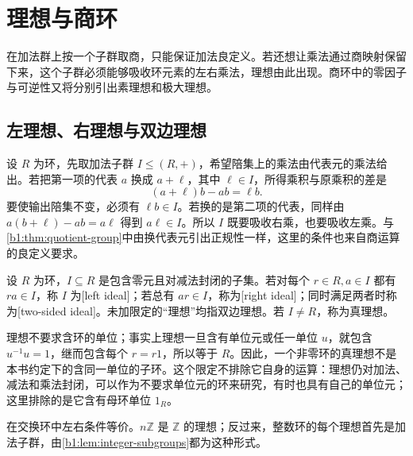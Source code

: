 
\section{理想与商环}
\label{b1:sec:1002}

在加法群上按一个子群取商，只能保证加法良定义。若还想让乘法通过商映射保留下来，这个子群必须能够吸收环元素的左右乘法，理想由此出现。商环中的零因子与可逆性又将分别引出素理想和极大理想。

%
%

\subsection{左理想、右理想与双边理想}
\label{b1:subsec:1002:01}
设 \(R\) 为环，先取加法子群 \(I\leq(R,+)\)，希望陪集上的乘法由代表元的乘法给出。若把第一项的代表 \(a\) 换成 \(a+\ell\)，其中 \(\ell\in I\)，所得乘积与原乘积的差是
\[
	(a+\ell)b-ab=\ell b.
\]
要使输出陪集不变，必须有 \(\ell b\in I\)。若换的是第二项的代表，同样由 \(a(b+\ell)-ab=a\ell\) 得到 \(a\ell\in I\)。所以 \(I\) 既要吸收右乘，也要吸收左乘。与\cref{b1:thm:quotient-group}中由换代表元引出正规性一样，这里的条件也来自商运算的良定义要求。

\begin{definition}\label{b1:def:ring-ideal}
	设 \(R\) 为环，\(I\subseteq R\) 是包含零元且对减法封闭的子集。若对每个 \(r\in R,a\in I\) 都有 \(ra\in I\)，称 \(I\) 为[left ideal]；若总有 \(ar\in I\)，称为[right ideal]；同时满足两者时称为[two-sided ideal]。未加限定的“理想”均指双边理想。若 \(I\ne R\)，称为真理想。
\end{definition}
理想不要求含环的单位；事实上理想一旦含有单位元或任一单位 \(u\)，就包含 \(u^{-1}u=1\)，继而包含每个 \(r=r1\)，所以等于 \(R\)。因此，一个非零环的真理想不是本书约定下的含同一单位的子环。这个限定不排除它自身的运算：理想仍对加法、减法和乘法封闭，可以作为不要求单位元的环来研究，有时也具有自己的单位元；这里排除的是它含有母环单位 \(1_R\)。

\ProseParagraphBreak
在交换环中左右条件等价。\(n\mathbb Z\) 是 \(\mathbb Z\) 的理想；反过来，整数环的每个理想首先是加法子群，由\cref{b1:lem:integer-subgroups}都为这种形式。

